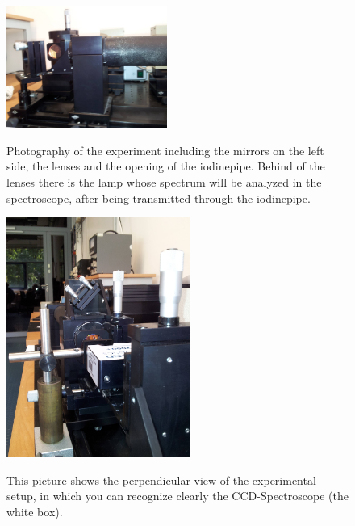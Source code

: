 \begin{figure}
\caption{Photography of the experiment including the mirrors on
    the left side, the lenses and the opening of the iodinepipe.
    Behind of the lenses there is the lamp whose spectrum will
    be analyzed in the spectroscope, after being transmitted
    through the iodinepipe.} 
\includegraphics[width=0.47\textwidth]{pics/const4}
 \label{fig:const4}

\end{figure}

\begin{figure} 
\caption{This picture shows the perpendicular view of the
    experimental setup, in which you can recognize clearly
    the CCD-Spectroscope (the white box). } 
\includegraphics[width=6cm]{pics/const3}
 \label{fig:const3}
\end{figure}

